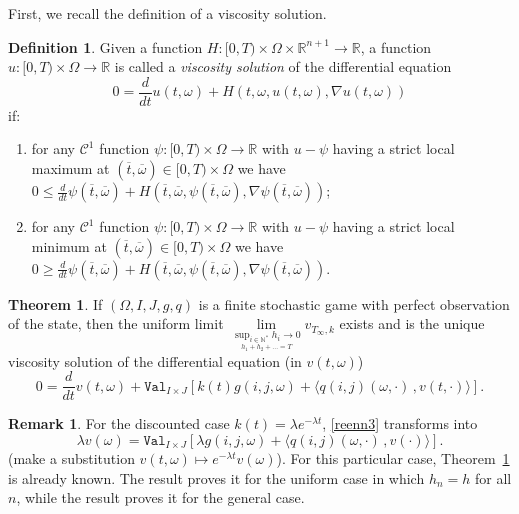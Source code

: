 \documentclass[english,openary,12pt]{article}
\theoremstyle{definition}
\newtheorem{remark}{Remark}
\newtheorem{definition}{Definition}
\newtheorem{theorem}{Theorem}
\newcommand{\R}{\mathbb{R}}
\newcommand{\N}{\mathbb{N}}
\begin{document}
First, we recall the definition of a viscosity solution.

\begin{definition}
Given a function $H : [0,T) \times \Omega \times \R^{n+1} \to \R$, a function $u : [0,T) \times \Omega \to \R$ is called a \emph{viscosity solution} of the differential equation 
$$0 = \frac{d}{d t} u (t,\omega) + H(t, \omega, u(t,\omega), \nabla u(t,\omega))$$
if:
\begin{enumerate}
\item for any $\mathcal C^1$ function $\psi : [0,T) \times \Omega \to \R$ with  $u - \psi$ having a strict local maximum at $(\overline{t}, \overline{\omega}) \in [0,T) \times \Omega$ we have
$0 \le \frac{d}{d t} \psi (\overline{t}, \overline{\omega}) + H(\overline{t}, 
\overline{\omega}, \psi(\overline{t}, \overline{\omega}), \nabla \psi(\overline{t}, \overline{\omega}))$;
\item for any $\mathcal C^1$ function $\psi : [0,T) \times \Omega \to \R$ with 
$u - \psi$ having a strict local minimum at $(\overline{t}, \overline{\omega}) \in 
[0,T) \times \Omega$ we have
$0 \ge \frac{d}{d t} \psi (\overline{t}, \overline{\omega}) + H(\overline{t}, 
\overline{\omega}, \psi(\overline{t}, \overline{\omega}), \nabla \psi(\overline{t}, \overline{\omega}))$.
\end{enumerate}
\end{definition}

\begin{theorem}
\label{xmn444}
If $(\Omega, I, J, g, q)$ is a finite stochastic game with perfect observation of the state, then the uniform limit
$\lim\limits_{\underset{h_1+h_2+\ldots = T}{\sup_{i\in\N^*} h_i \to 0}} 
v_{T_\infty,k}$ exists and is the unique viscosity solution of the differential equation (in $v(t,\omega)$)
\begin{equation}
\label{reenn3}
0 = \frac{d}{dt} v(t,\omega) + \texttt{Val}_{I\times J} [k(t) g(i,j,\omega) + 
\langle q(i,j)(\omega,\cdot)\,, v(t,\cdot) \rangle].
\end{equation}
\end{theorem}

\begin{remark}
	For the discounted case $k(t)=\lambda e^{-\lambda t}$, \eqref{reenn3} transforms into
	\begin{equation}
	\label{wwr5}
	\lambda v(\omega) = \texttt{Val}_{I\times J}\left[\lambda g(i,j,\omega) + 
	\langle q(i,j)(\omega,\cdot)\,, v(\cdot)\rangle\right].
	\end{equation} 
  (make a substitution $v(t,\omega) \mapsto e^{-\lambda t} v(\omega)$). For this particular case, Theorem~\ref{xmn444} is already known. The result \cite[Theorem~1]{Ney13} proves it for the uniform case in which $h_n = h$ for all $n$, while the result \cite[Corollary~7.1]{SorVig16} proves it for the general case.
\end{remark}
\end{document}
